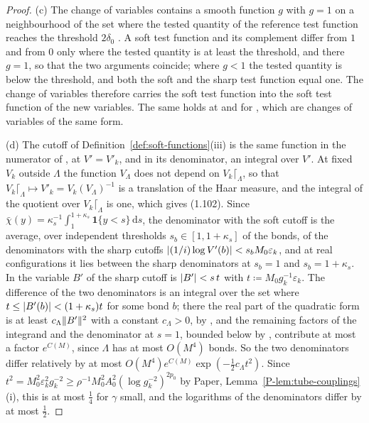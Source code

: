 \documentclass[11pt]{preprint}
\newcommand{\dd}{\mathrm{d}}
\DeclarePairedDelimiter{\abs}{\lvert}{\rvert}
\DeclarePairedDelimiter{\norm}{\lVert}{\rVert}
\numberwithin{equation}{section}
\theoremstyle{definition}
\theoremstyle{remark}
\theoremstyle{plain}
\begin{document}
\begin{proof}
(c) The change of variables \cite[(1.22), p.~251]{BalabanCRE} contains a smooth function $g$ with $g = 1$ on a neighbourhood of the set where the tested quantity of the reference test function reaches the threshold $2\delta_0$ \cite[p.~252]{BalabanCRE}. A soft test function and its complement differ from $1$ and from $0$ only where the tested quantity is at least the threshold, and there $g = 1$, so that the two arguments coincide; where $g < 1$ the tested quantity is below the threshold, and both the soft and the sharp test function equal one. The change of variables therefore carries the soft test function into the soft test function of the new variables. The same holds at \cite[p.~269]{BalabanCRE} and for \cite[(1.59), p.~188]{BalabanLFR1}, which are changes of variables of the same form.

(d) The cutoff of Definition~\ref{def:soft-functions}(iii) is the same function in the numerator of \cite[(1.100)]{BalabanLFR1}, at $V' = V'_k$, and in its denominator, an integral over $V'$. At fixed $V_k$ outside $\Lambda$ the function $V_\Lambda$ does not depend on $V_k\lceil_\Lambda$, so that $V_k\lceil_\Lambda \mapsto V'_k = V_k(V_\Lambda)^{-1}$ is a translation of the Haar measure, and the integral of the quotient over $V_k\lceil_\Lambda$ is one, which gives (1.102). Since $\bar\chi(y) = \kappa_s^{-1}\int_1^{1+\kappa_s}\mathbf 1\{y < s\}\,\dd s$, the denominator with the soft cutoff is the average, over independent thresholds $s_b \in [1, 1 + \kappa_s]$ of the bonds, of the denominators with the sharp cutoffs $\abs{(1/i)\log V'(b)} < s_bM_0\varepsilon_k$, and at real configurations it lies between the sharp denominators at $s_b = 1$ and $s_b = 1 + \kappa_s$. In the variable $B'$ of \cite[(1.1), (1.2), pp.~356--357]{BalabanLFR2} the sharp cutoff is $\abs{B'} < s\,t$ with $t \coloneqq M_0g_k^{-1}\varepsilon_k$. The difference of the two denominators is an integral over the set where $t \leq \abs{B'(b)} < (1 + \kappa_s)t$ for some bond $b$; there the real part of the quadratic form is at least $c_\Lambda\norm{B'}^2$ with a constant $c_\Lambda > 0$, by \cite[(1.7)--(1.9), p.~358]{BalabanLFR2}, and the remaining factors of the integrand and the denominator at $s = 1$, bounded below by \cite[(1.10), (1.11), p.~358]{BalabanLFR2}, contribute at most a factor $e^{C(M)}$, since $\Lambda$ has at most $O(M^4)$ bonds. So the two denominators differ relatively by at most $O(M^4)e^{C(M)}\exp(-\frac12c_\Lambda t^2)$. Since $t^2 = M_0^2\varepsilon_k^2g_k^{-2} \geq \rho^{-1}M_0^2A_0^2(\log g_k^{-2})^{2p_0}$ by Paper, Lemma~\ref{P-lem:tube-couplings}(i), this is at most $\frac14$ for $\gamma$ small, and the logarithms of the denominators differ by at most $\frac12$.


\end{proof}
\end{document}
